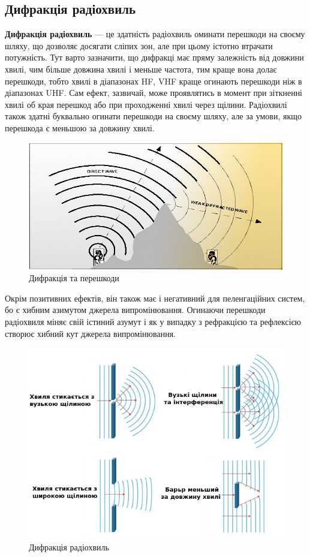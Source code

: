 \documentclass{article}
\begin{document}
\subsection{Дифракція радіохвиль}

\textbf{Дифракція радіохвиль} --- це здатність радіохвиль оминати перешкоди на своєму шляху, що дозволяє досягати сліпих зон, але при цьому істотно втрачати потужність. Тут варто зазначити, що дифракці має пряму залежність від довжини хвилі, чим більше довжина хвилі і меньше частота, тим краще вона долає перешкоди, тобто хвилі в діапазонах HF, VHF краще огинають перешкоди ніж в діапазонах UHF. Сам ефект, зазвичай, може проявлятись в момент при зіткненні хвилі об края перешкод або при проходженні хвилі через щілини. Радіохвилі також здатні буквально огинати перешкоди на своєму шляху, але за умови, якщо перешкода є меньшою за довжину хвилі.

\begin{figure}[h!]
	\centering
	\includegraphics[width=0.8\linewidth]{images/diffraction.png}
	\caption{\label{fig:diffraction}Дифракція та перешкоди}
\end{figure}

Окрім позитивних ефектів, він також має і негативний для пеленгаційних систем, бо є хибним азимутом джерела випромінювання. Огинаючи перешкоди радіохвиля міняє свій істиний азумут і як у випадку з рефракцією та рефлексією створює хибний кут джерела випромінювання. 
\begin{figure}[h!]
	\centering
	\includegraphics[width=0.6\linewidth]{images/diffraction_all.png}
	\caption{\label{fig:diffraction_all} Дифракція радіохвиль}
\end{figure}
\end{document}
